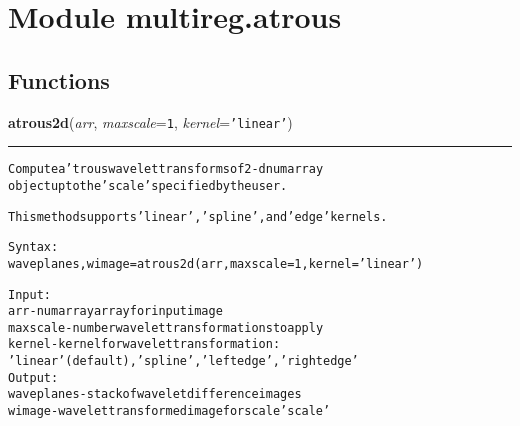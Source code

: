 %
%
%


\section{Module multireg.atrous}

    \label{multireg:atrous}


  \subsection{Functions}

    \label{multireg:atrous:atrous2d}
    \vspace{0.5ex}

    \begin{boxedminipage}{\textwidth}

    \raggedright \textbf{atrous2d}(\textit{arr}, \textit{maxscale}=\texttt{1\-}, \textit{kernel}=\texttt{'\-l\-i\-n\-e\-a\-r\-'\-})

    \vspace{-1.5ex}

    \rule{\textwidth}{0.5\fboxrule}
\begin{alltt}
Compute a' trous wavelet transforms of 2-d numarray
object up to the 'scale' specified by the user. 

This method supports 'linear', 'spline', and 'edge' kernels.

Syntax:
    waveplanes,wimage = atrous2d(arr,maxscale=1,kernel='linear')

Input:
    arr        - numarray array for input image
    maxscale   - number wavelet transformations to apply
    kernel     - kernel for wavelet transformation:
                    'linear'(default),'spline','leftedge','rightedge'
Output:
    waveplanes - stack of wavelet difference images
    wimage     - wavelet transformed image for scale 'scale'\end{alltt}

    \vspace{1ex}

    \end{boxedminipage}

